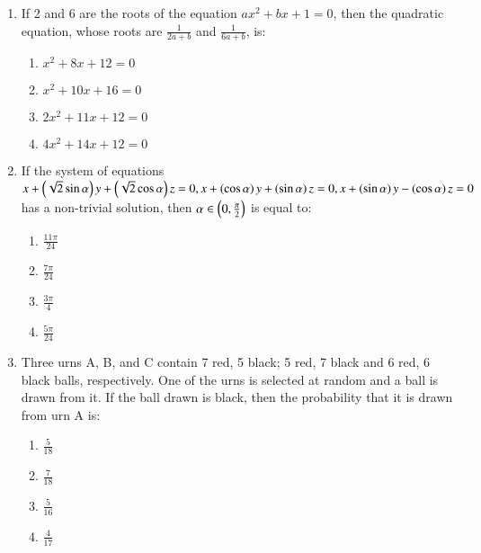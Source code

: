 \documentclass[journal]{IEEEtran}
\begin{document}
\begin{enumerate}
    \item If 2 and 6 are the roots of the equation $ax^2+bx+1=0$, then the quadratic equation, whose roots are $\frac{1}{2a+b}$ and $\frac{1}{6a+b}$, is:

        \begin{multicols}{4}
            \begin{enumerate}
                \item $x^2+8x+12=0$
                \item $x^2+10x+16=0$
                \item $2x^2+11x+12=0$
                \item $4x^2+14x+12=0$
            \end{enumerate}
        \end{multicols}

    \item If the system of equations $x+\left(\sqrt{2}\sin\alpha\right)y+\left(\sqrt{2}\cos\alpha\right)z=0, x+\left(\cos\alpha\right)y+\left(\sin\alpha\right)z=0, x+\left(\sin\alpha\right)y-\left(\cos\alpha\right)z=0$ has a non-trivial solution, then $\alpha\in\left(0,\frac{\pi}{2}\right)$ is equal to:

        \begin{multicols}{4}
            \begin{enumerate}
                \item $\frac{11\pi}{24}$
                \item $\frac{7\pi}{24}$
                \item $\frac{3\pi}{4}$
                \item $\frac{5\pi}{24}$
            \end{enumerate}
        \end{multicols}

    \item Three urns A, B, and C contain 7 red, 5 black; 5 red, 7 black and 6 red, 6 black balls, respectively. One of the urns is selected at random and a ball is drawn from it. If the ball drawn is black, then the probability that it is drawn from urn A is:

        \begin{multicols}{4}
            \begin{enumerate}
                \item $\frac{5}{18}$
                \item $\frac{7}{18}$
                \item $\frac{5}{16}$
                \item $\frac{4}{17}$
            \end{enumerate}
        \end{multicols}

\end{enumerate}
\end{document}

